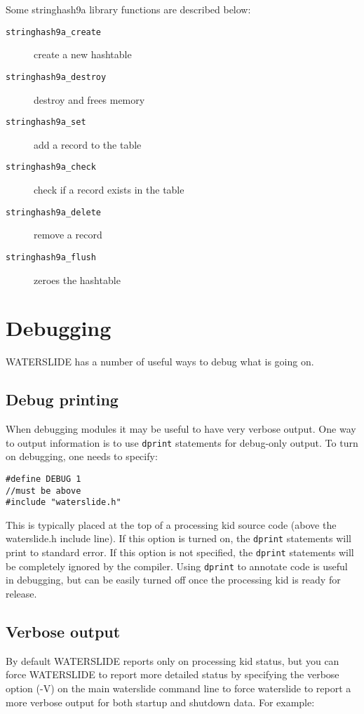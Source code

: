 \documentclass[11pt]{article}
\begin{document}
Some stringhash9a library functions are described below: 
\begin{description}
\item[\texttt{stringhash9a\_create}] create a new hashtable
\item[\texttt{stringhash9a\_destroy}] destroy and frees memory
\item[\texttt{stringhash9a\_set}] add a record to the table 
\item[\texttt{stringhash9a\_check}] check if a record exists in the table 
\item[\texttt{stringhash9a\_delete}] remove a record
\item[\texttt{stringhash9a\_flush}] zeroes the hashtable
\end{description}


\section{Debugging}
WATERSLIDE has a number of useful ways to debug what is going on.  

\subsection{Debug printing}
When debugging modules it may be useful to have very verbose output.  One way 
to output information is to use \texttt{dprint} statements for debug-only 
output.  To turn on debugging, one needs to specify:

\begin{lstlisting}
#define DEBUG 1
//must be above
#include "waterslide.h"
\end{lstlisting}

This is typically placed at the top of a processing kid source code (above the 
waterslide.h include line). If this option is turned on, the \texttt{dprint} 
statements will print to standard error.  If this option is not specified, the 
\texttt{dprint} statements will be completely ignored by the compiler.  
Using \texttt{dprint} to annotate code is useful in debugging, but can be 
easily turned off once the processing kid is ready for release.

\subsection{Verbose output}
By default WATERSLIDE reports only on processing kid status, but you can force 
WATERSLIDE to report more detailed status by specifying the verbose option (-V) 
on the main waterslide command line to force waterslide to report a more verbose 
output for both startup and shutdown data.  For example: 
\end{document}
